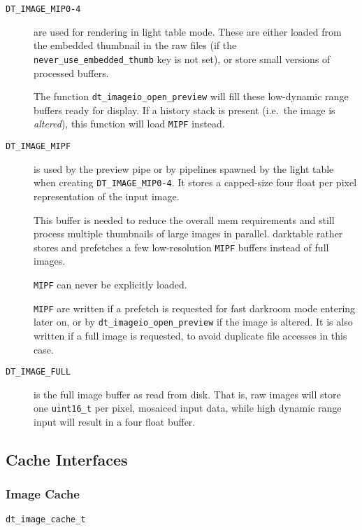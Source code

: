 \documentclass[a4paper,twoside]{scrartcl}
\newcommand{\code}[1]{\texttt{\color{codecol}#1}}
\begin{document}
\begin{description}
  \item[\code{DT\_IMAGE\_MIP0-4}] are used for rendering in light table mode. These are either loaded from the embedded
    thumbnail in the raw files (if the \code{never\_use\_embedded\_thumb} key is not set), or store small versions of
    processed buffers.

    The function \code{dt\_imageio\_open\_preview} will fill these low-dynamic range buffers ready for display. If a history
    stack is present (i.e.\ the image is {\em altered}), this function will load \code{MIPF} instead.

  \item[\code{DT\_IMAGE\_MIPF}] is used by the preview pipe or by pipelines spawned by the light table when creating
    \code{DT\_IMAGE\_MIP0-4}. It stores a capped-size four float per pixel representation of the input image.

    This buffer is needed to reduce the overall mem requirements and still process multiple thumbnails of large images
    in parallel. darktable rather stores and prefetches a few low-resolution \code{MIPF} buffers instead of full images.

    \code{MIPF} can never be explicitly loaded.

    \code{MIPF} are written if a prefetch is requested for fast darkroom mode entering later on, or by \code{dt\_imageio\_open\_preview}
    if the image is altered. It is also written if a full image is requested, to avoid duplicate file accesses in this case.

  \item[\code{DT\_IMAGE\_FULL}] is the full image buffer as read from disk. That is, raw images will store one \code{uint16\_t}
    per pixel, mosaiced input data, while high dynamic range input will result in a four float buffer.

\end{description}


\newpage
\subsection{Cache Interfaces}

\subsubsection{Image Cache}

\code{dt\_image\_cache\_t}
\end{document}
